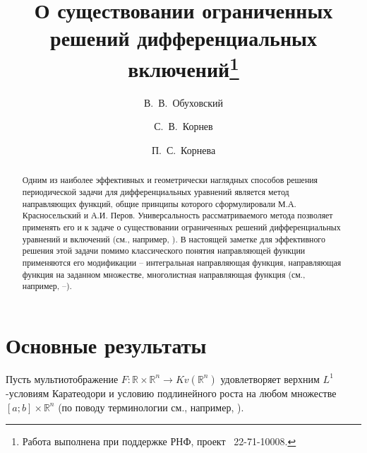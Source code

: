 \pagebreak

\title{О существовании ограниченных решений дифференциальных включений\thanks{Работа выполнена при поддержке РНФ, проект \textnumero~22-71-10008.}}
\author{В.~В.~Обуховский \and С.~В.~Корнев  \and  П.~С.~Корнева
} %


\maketitle

\begin{abstract}
Одним из наиболее эффективных и геометрически наглядных способов решения периодической задачи для дифференциальных уравнений является метод направляющих функций, общие принципы которого сформулировали М.А. Красносельский и А.И. Перов. Универсальность рассматриваемого метода позволяет применять его и к задаче о существовании ограниченных решений дифференциальных уравнений и включений (см., например, \cite{k_kr}).
В настоящей заметке для эффективного решения этой задачи помимо классического понятия направляющей функции применяются его модификации -- интегральная направляющая функция, направляющая функция на заданном множестве, многолистная направляющая функция (см., например, \cite{k_b_g_m_o}--\cite{k_k_o_z_2}).

\end{abstract}

\section{Основные результаты} %

Пусть мультиотображение $F:\mathbb{R} \times \mathbb{R}^n \to Kv(\mathbb{R}^n)$ удовлетворяет верхним $L^1$-условиям Каратеодори и условию подлинейного роста на любом множестве $[a;b]\times \mathbb{R}^n$ (по поводу терминологии см., например, \cite{k_b_g_m_o}).



